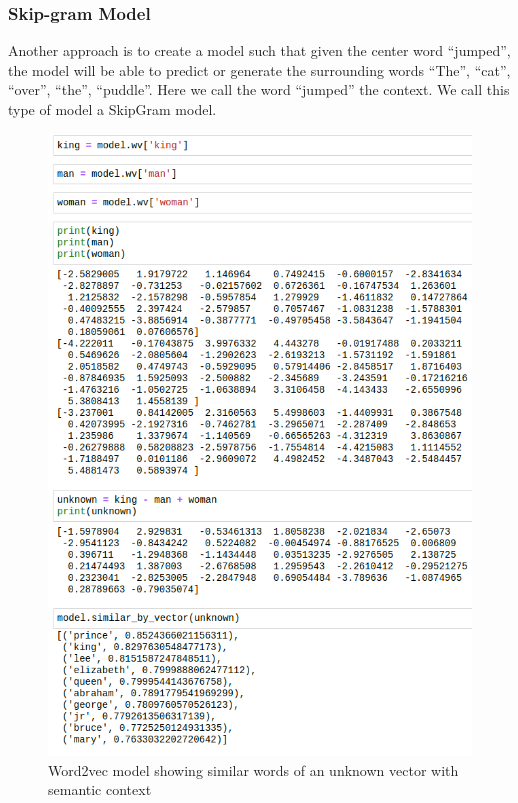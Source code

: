 \subsubsection{Skip-gram Model}
Another approach is to create a model such that given the center word “jumped”, the model will be able to predict or generate the surrounding words “The”, “cat”, “over”, “the”, “puddle”. Here we call the word “jumped” the context. We call this type of model a SkipGram model.


\clearpage
\begin{figure}[tbh]
\begin{center}
	\includegraphics[width = 4.55in]{images/word2vec_.png}
	\caption{Word2vec model showing similar words of an unknown vector with semantic context}
	\label{some_tfidf}
\end{center}
\end{figure}	


